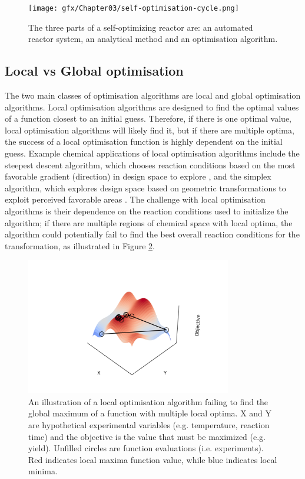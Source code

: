 \begin{figure}
    \centering
    \texttt{[image: gfx/Chapter03/self-optimisation-cycle.png]}
    \caption{The three parts of a self-optimizing reactor are: an automated reactor system, an analytical method and an optimisation algorithm.}
    \label{fig:optimisation-cycle}
\end{figure}

\subsection{Local vs Global optimisation}
The two main classes of optimisation algorithms are local and global optimisation algorithms. Local optimisation algorithms are designed to find the optimal values of a function closest to an initial guess. Therefore, if there is one optimal value, local optimisation algorithms will likely find it, but if there are multiple optima, the success of a local optimisation function is highly dependent on the initial guess. Example chemical applications of local optimisation algorithms include the steepest descent algorithm, which chooses reaction conditions based on the most favorable gradient (direction) in design space to explore \cite{McMullen2010a}, and the simplex algorithm, which explores design space based on geometric transformations to exploit perceived favorable areas \cite{Routh1977, Bourne2011}. The challenge with local optimisation algorithms is their dependence on the reaction conditions used to initialize the algorithm; if there are multiple regions of chemical space with local optima, the algorithm could potentially fail to find the best overall reaction conditions for the transformation, as illustrated in Figure \ref{fig:local-optimisation}.

\begin{figure}
    \centering
    \includegraphics[width=0.8\textwidth]{gfx/Chapter03/local_optimzation.png}
    \caption{An illustration of a local optimisation algorithm failing to find the global maximum of a function with multiple local optima. X and Y are hypothetical experimental variables (e.g. temperature, reaction time) and the objective is the value that must be maximized (e.g. yield). Unfilled circles are function evaluations (i.e. experiments). Red indicates local maxima function value, while blue indicates local minima.}
    \label{fig:local-optimisation}
\end{figure}
 

